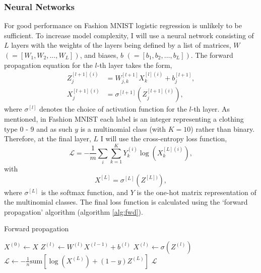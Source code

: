 \documentclass[11pt,twocolumn]{article}
\begin{document}
\subsubsection*{Neural Networks}
For good performance on Fashion MNIST logistic regression is unlikely to be sufficient. To increase model complexity, I will use a neural network consisting of $L$ layers with the weights of the layers being defined by a list of matrices, $W$ $(=[W_1,W_2,\ldots,W_L])$, and biases, $b$ $(=[b_1,b_2,\ldots,b_L])$. The forward propagation equation for the $l$-th layer takes the form,
\begin{align}
Z^{[l+1](i)}_j&=W^{[l+1]}_{j,k}X^{[l](i)}_k+b^{[l+1]}_j,  \label{propZ}\\
X^{[l+1](i)}_j&=\sigma^{[l+1]}(Z^{[l+1](i)}_j)\label{propX},
\end{align}
where $\sigma^{[l]}$ denotes the choice of activation function for the $l$-th layer. As mentioned, in Fashion MNIST each label is an integer representing a clothing type 0 - 9 and as such $y$ is a multinomial class (with $K=10$) rather than binary.  Therefore, at  the final layer, $L$ I will use the cross-entropy loss function,
\begin{equation}
\mathcal{L}=-\frac{1}{m}\sum_{i}\sum_{k=1}^{K} Y^{(i)}_k\log{(X^{[L](i)}_k)},\label{celossfunc}
\end{equation}
with
\begin{equation}
X^{[L]}=\sigma^{[L]}{(Z^{[L])})},
\end{equation}
where $\sigma^{[L]}$ is the softmax function, and $Y$ is the one-hot matrix representation of the multinomial classes. The final loss function is calculated using the `forward propagation' algorithm (algorithm \ref{alg:fwd}).

%
\begin{algorithm}
\caption{Forward propagation}\label{alg:fwd}
\begin{algorithmic}
	\State $X^{(0)} \gets X$
		\State $Z^{(l)} \gets W^{(l)}X^{(l-1)}+b^{(l)}$
		\State $X^{(l)} \gets \sigma(Z^{(l)} )$
	\EndFor
	\State $\mathcal{L} \gets -\frac{1}{n} \textrm{sum}{\left[\log(X^{(L)})+(1-y)Z^{(L)}\right]}$
	\State \Return $\mathcal{L}$
\EndProcedure
\end{algorithmic}
\end{algorithm}
\end{document}
